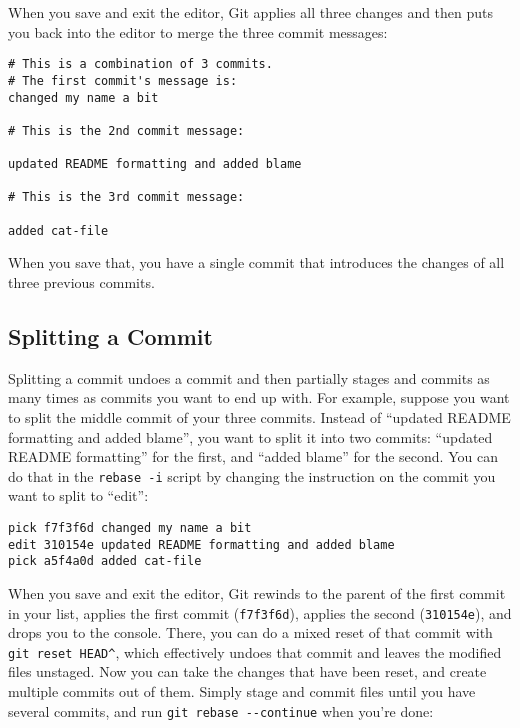 \documentclass[a4paper]{book}
\begin{document}
When you save and exit the editor, Git applies all three changes and then puts you back into the editor to merge the three commit messages:

\begin{shaded}\begin{verbatim}
# This is a combination of 3 commits.
# The first commit's message is:
changed my name a bit

# This is the 2nd commit message:

updated README formatting and added blame

# This is the 3rd commit message:

added cat-file
\end{verbatim}\end{shaded}

When you save that, you have a single commit that introduces the changes of all three previous commits.

\subsection{Splitting a Commit}\label{splitting-a-commit}

Splitting a commit undoes a commit and then partially stages and commits as many times as commits you want to end up with. For example, suppose you want to split the middle commit of your three commits. Instead of “updated README formatting and added blame”, you want to split it into two commits: “updated README formatting” for the first, and “added blame” for the second. You can do that in the \texttt{rebase -i} script by changing the instruction on the commit you want to split to “edit”:

\begin{shaded}\begin{verbatim}
pick f7f3f6d changed my name a bit
edit 310154e updated README formatting and added blame
pick a5f4a0d added cat-file
\end{verbatim}\end{shaded}

When you save and exit the editor, Git rewinds to the parent of the first commit in your list, applies the first commit (\texttt{f7f3f6d}), applies the second (\texttt{310154e}), and drops you to the console. There, you can do a mixed reset of that commit with \texttt{git reset HEAD\^{}}, which effectively undoes that commit and leaves the modified files unstaged. Now you can take the changes that have been reset, and create multiple commits out of them. Simply stage and commit files until you have several commits, and run \texttt{git rebase -{}-continue} when you're done:
\end{document}
